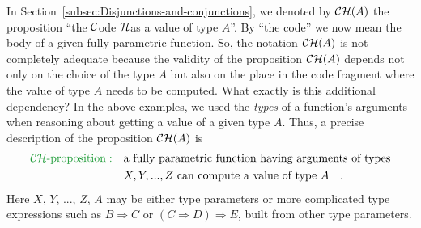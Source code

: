 In Section~\ref{subsec:Disjunctions-and-conjunctions}, we denoted
by ${\cal CH}(A)$ the proposition ``the ${\cal C}$ode ${\cal H}$as
a value of type $A$''. By ``the code'' we now mean the body of
a given fully parametric function. So, the notation ${\cal CH}(A)$
is not completely adequate because the validity of the proposition
${\cal CH}(A)$ depends not only on the choice of the type $A$ but
also on the place in the code fragment where the value of type $A$
needs to be computed. What exactly is this additional dependency?
In the above examples, we used the \emph{types} of a function's arguments
when reasoning about getting a value of a given type $A$. Thus, a
precise description of the proposition ${\cal CH}(A)$ is 
\begin{align}
{\color{greenunder}{\cal CH}\text{-proposition}:}\quad & \text{a fully parametric function having arguments of types}\nonumber \\
 & X,Y,...,Z\text{ can compute a value of type }A\quad.\label{eq:ch-CH-proposition-def}
\end{align}
Here $X$, $Y$, ..., $Z$, $A$ may be either type parameters or
more complicated type expressions such as $B\Rightarrow C$ or $(C\Rightarrow D)\Rightarrow E$,
built from other type parameters.

